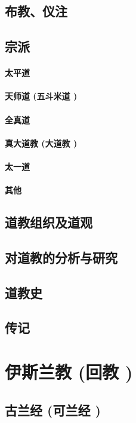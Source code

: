 \documentclass[UTF8]{../RepresentationUniverse}
\begin{document}
\section{布教、仪注}
\section{宗派}
    \subsubsection{太平道}
    \subsubsection{天师道 (五斗米道 )}
    \subsubsection{全真道}
    \subsubsection{真大道教 (大道教 )}
    \subsubsection{太一道}
    \subsubsection{其他}

\section{道教组织及道观}
\section{对道教的分析与研究}
\section{道教史}
\section{传记}


\chapter{伊斯兰教 (回教 )}
\section{古兰经 (可兰经 )}
\end{document}

